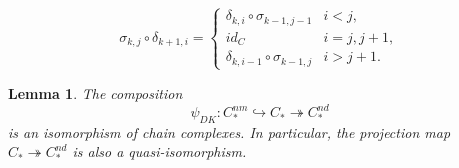 \documentclass[10pt,a4paper]{amsart}
\newtheorem{lemma}{Lemma}
\begin{document}
\begin{equation}\label{eq:sd}
\sigma_{k,j}\circ\delta_{k+1,i}=\left\{\begin{array}{ll}
\delta_{k,i}\circ\sigma_{k-1,j-1} & i<j, \\ \mathit{id}_C & i=j,j+1, \\ \delta_{k,i-1}\circ\sigma_{k-1,j} & i>j+1.
\end{array}\right.
\end{equation}

\begin{lemma}\label{lemma:DK}
The composition
\begin{equation}
\psi_{DK}:C_\ast^\mathit{nm}\hookrightarrow C_\ast\twoheadrightarrow C_\ast^\mathit{nd}
\end{equation}
is an isomorphism of chain complexes. In particular, the projection map $C_\ast\twoheadrightarrow C_\ast^\mathit{nd}$ is also a quasi-isomorphism.
\end{lemma}
\end{document}
